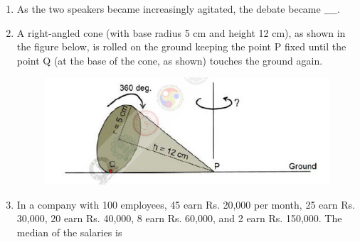 \documentclass[journal]{IEEEtran}
\begin{document}
\begin{enumerate}[leftmargin=0pt]
    \item As the two speakers became increasingly agitated, the debate became $\_\_\_\_$.
    \begin{enumerate}
    \end{enumerate}

    \item A right-angled cone (with base radius 5 cm and height 12 cm), as shown in the figure below, is rolled on the ground keeping the point P fixed until the point Q (at the base of the cone, as shown) touches the ground again.
    \begin{figure}[h]
    \centering
    \includegraphics[width=0.5\columnwidth]{Figs/image (31).png}
    \caption*{}
    \label{fig:58}
    \end{figure}
    \newpage
    \begin{enumerate}
    \end{enumerate}

    \item In a company with 100 employees, 45 earn Rs. 20,000 per month, 25 earn Rs. 30,000, 20 earn Rs. 40,000, 8 earn Rs. 60,000, and 2 earn Rs. 150,000. The median of the salaries is
    \begin{enumerate}
    \end{enumerate}


\end{enumerate}
\end{document}
